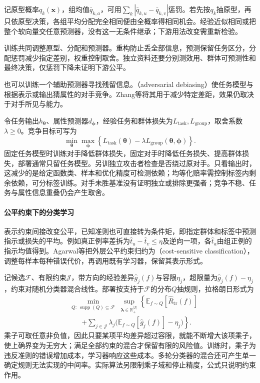 记原型概率$q_k(\bm{x})$，组均值$\bar q_{k,a}$，可用$\sum_k|\bar q_{k,u}-\bar q_{k,v}|$惩罚。若先按$q_k$抽原型，再只依原型决策，各组平均分配完全相同便由全概率得相同机会。经验近似相同或把整个软向量交任意预测器，没有这一无条件继承；下游用法改变需重新检验。

训练共同调整原型、分配和预测器。重构防止丢全部信息，预测保留任务区分，分配惩罚减少指定差别，权重控制取舍。独立资料还要分别测效用、群体可预测性和最终决策，仅惩罚下降未证明下游公平。

也可以训练一个辅助预测器寻找残留信息。（adversarial debiasing）使任务模型与根据表示或输出猜属性的对手竞争。Zhang等将其用于减少特定差距，效果仍取决于对手所见与能力。

令任务输出$h_{\bm{\theta}}$、属性预测器$d_{\bm{\phi}}$，经验任务和群体损失为$L_{\mathrm{task}},L_{\mathrm{group}}$，取舍系数$\lambda\geq0$。竞争目标可写为
\[
 \min_{\bm{\theta}}\max_{\bm{\phi}}
 \left\{L_{\mathrm{task}}(\bm{\theta})
       -\lambda L_{\mathrm{group}}(\bm{\theta},\bm{\phi})\right\}.
\]
固定任务模型时训练对手降低群体损失，固定对手时降低任务损失、提高群体损失，部署通常只留任务模型。另训独立攻击者检查是否绕过原对手。只看输出时，这减少的是给定函数类、样本和优化精度可检测依赖；均等化赔率需控制标签内剩余依赖，可分标签训练。对手未胜基准没有证明独立或排除更强者；竞争不稳、任务与属性信息重叠仍会产生取舍。

\paragraph{公平约束下的分类学习}

表示约束间接改变公平，已知准则也可直接转为条件矩，即指定群体和标签中预测指示或损失的平均。例如真正例率差拆为$\hat t_u-\hat t_v\leq\eta$及逆向一项，各$\hat t_a$由组正例的指示均值得到。Agarwal等把外层公平约束归约为（cost-sensitive classification），调整每样本每种错误代价，再调用既有学习器，保留其表示形式。

记候选$\mathcal F$、有限约束$\mathcal J$，带方向的经验差异$\hat g_j(f)$与容限$\eta_j$，超限量为$\hat g_j(f)-\eta_j$，约束对随机分类器混合线性。部署按支持于$\mathcal F$的分布$Q$抽规则，拉格朗日形式为
\begin{equation}
\begin{aligned}
 &\min_{\substack{Q:\ \operatorname{supp}(Q)\subseteq\mathcal F}}
 \sup_{\bm{\lambda}\in\mathbb R_+^{|\mathcal J|}}
 \left\{\mathbb E_{f\sim Q}[\widehat R_{\mathrm{tr}}(f)]\right.\\
 &\qquad\left.+
 \sum_{j\in\mathcal J}\lambda_j
 \bigl(\mathbb E_{f\sim Q}[\hat g_j(f)]-\eta_j\bigr)
 \right\}.
\end{aligned}
 \label{eq:fairness-reduction}
\end{equation}
乘子可取任意非负值，因此只要某项平均差异超过容限，就能不断增大该项乘子，使上确界变为无穷大；满足全部约束的混合才保留有限的风险值。训练时，乘子为违反准则的错误增加成本，学习器响应这些成本。多轮分类器的混合还可产生单一确定规则无法实现的中间率。实际算法另限制乘子域和停止精度，公式只说明约束作用。

